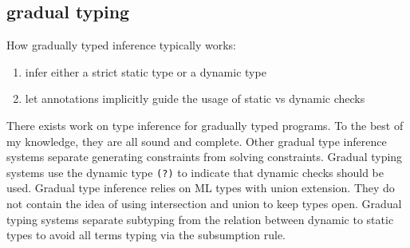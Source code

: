 \documentclass[sigplan,screen]{acmart}
\begin{document}
\subsection*{gradual typing}
How gradually typed inference typically works:
\begin{enumerate}
  \item infer either a strict static type or a dynamic type
  \item let annotations implicitly guide the usage of static vs dynamic checks 
\end{enumerate}
There exists work on type inference for gradually typed programs.
To the best of my knowledge, they are all sound and complete.
Other gradual type inference systems separate 
generating constraints from solving constraints.
Gradual typing systems use the dynamic type \lstinline{(?)} to indicate 
that dynamic checks should be used.
Gradual type inference relies on ML types with union extension.
They do not contain the idea of using intersection and union to keep types open.
Gradual typing systems separate subtyping from the relation 
between dynamic to static types to avoid all terms typing via the subsumption rule.
\end{document}
